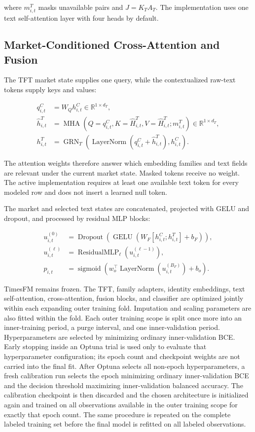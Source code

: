 \documentclass[11pt]{article}
\newcommand{\R}{\mathbb{R}}
\newcommand{\sigmoid}{\operatorname{sigmoid}}
\begin{document}
where $m^T_{i,t}$ masks unavailable pairs and $J=K_TA_T$. The implementation
uses one text self-attention layer with four heads by default.

\subsection{Market-Conditioned Cross-Attention and Fusion}

The TFT market state supplies one query, while the contextualized raw-text
tokens supply keys and values:

\begin{align}
q^C_{i,t}
&=
W_Qh^C_{i,t}\in\R^{1\times d_T},\\
\widehat h^T_{i,t}
&=
\operatorname{MHA}
\left(
Q=q^C_{i,t},
K=\widehat H^T_{i,t},
V=\widehat H^T_{i,t};
m^T_{i,t}
\right)
\in\R^{1\times d_T},\\
h^T_{i,t}
&=
\operatorname{GRN}_{T}
\left(
\operatorname{LayerNorm}
(q^C_{i,t}+\widehat h^T_{i,t}),
h^C_{i,t}
\right).
\end{align}

The attention weights therefore answer which embedding families and text
fields are relevant under the current market state. Masked tokens receive no
weight. The active implementation requires at least one available text token
for every modeled row and does not insert a learned null token.

The market and selected text states are concatenated, projected with GELU and
dropout, and processed by residual MLP blocks:

\begin{align}
u^{(0)}_{i,t}
&=
\operatorname{Dropout}\!\left(
\operatorname{GELU}\!\left(
W_F[h^C_{i,t};h^T_{i,t}]+b_F
\right)
\right),\\
u^{(\ell)}_{i,t}
&=
\operatorname{ResidualMLP}_{\ell}(u^{(\ell-1)}_{i,t}),\\
p_{i,t}
&=
\sigmoid\!\left(
w_o^\top\operatorname{LayerNorm}(u^{(B_F)}_{i,t})+b_o
\right).
\end{align}

TimesFM remains frozen. The TFT, family adapters, identity embeddings, text
self-attention, cross-attention, fusion blocks, and classifier are optimized
jointly within each expanding outer training fold. Imputation and scaling
parameters are also fitted within the fold. Each outer training scope is split
once more into an inner-training period, a purge interval, and one
inner-validation period. Hyperparameters are selected by minimizing ordinary
inner-validation BCE. Early stopping inside an Optuna trial is used only to
evaluate that hyperparameter configuration; its epoch count and checkpoint
weights are not carried into the final fit. After Optuna selects all non-epoch
hyperparameters, a fresh calibration run selects the epoch minimizing
ordinary inner-validation BCE and the decision threshold maximizing
inner-validation balanced accuracy. The calibration checkpoint is then
discarded and the chosen architecture is initialized again and trained on all
observations available in the outer training scope for exactly that epoch
count. The same procedure is repeated on the complete labeled training set
before the final model is refitted on all labeled observations.
\end{document}
